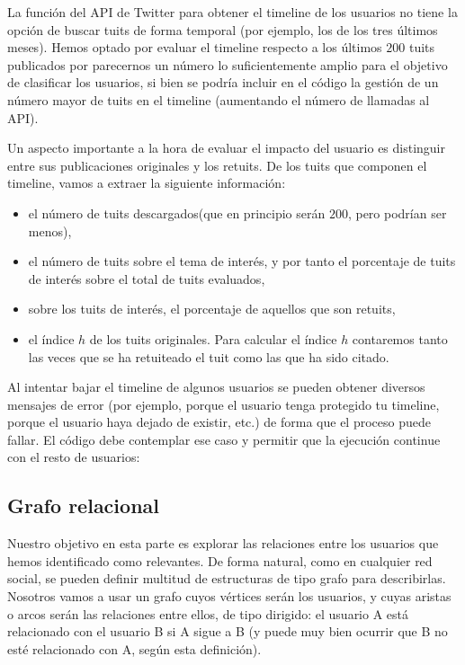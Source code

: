 La función del API de Twitter para obtener el timeline de los usuarios no tiene 
la opción de buscar tuits de forma temporal (por ejemplo, los de los tres
últimos meses). Hemos optado por evaluar el timeline respecto a los últimos
$200$ tuits publicados por parecernos un número lo suficientemente amplio para 
el objetivo de clasificar los usuarios, si bien se podría incluir en el código la
gestión de un número mayor de tuits en el timeline (aumentando el número de
llamadas al API).

Un aspecto importante a la hora de evaluar el impacto del usuario es distinguir 
entre sus publicaciones originales y los retuits. De los tuits que componen el 
timeline, vamos a extraer la siguiente información:
\begin{itemize}
\item el número de tuits descargados(que 
en principio serán $200$, pero podrían ser menos),
\item el número de tuits sobre el tema de interés, y por tanto el
porcentaje de tuits de interés sobre el total de tuits evaluados,
\item sobre los tuits de interés, el porcentaje de aquellos que son retuits,
\item el índice $h$ de los tuits originales. Para calcular el índice $h$ 
contaremos tanto las veces que se ha retuiteado el tuit como las que ha sido
citado.
\end{itemize}

Al intentar bajar el timeline de algunos usuarios se pueden
obtener diversos mensajes de error (por ejemplo, porque el usuario tenga
protegido tu timeline, porque el usuario haya dejado de existir, etc.)
de forma que el proceso puede fallar. El código debe contemplar ese
caso y permitir que la ejecución continue con el resto de usuarios:



\subsection{Grafo relacional}
\label{subsect:grafo}
Nuestro objetivo en esta parte es explorar las relaciones entre los usuarios que 
hemos identificado como relevantes. De forma natural, como en cualquier red social,
se pueden definir multitud de estructuras de tipo grafo para describirlas. Nosotros
vamos a usar un grafo cuyos vértices serán los usuarios, y cuyas aristas o arcos serán
las relaciones entre ellos, de tipo dirigido: el usuario A está relacionado con el
usuario B si A sigue a B (y puede muy bien ocurrir que B no esté relacionado con A,
según esta definición). 

